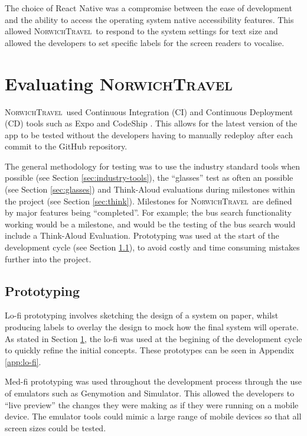\documentclass[cmpstyle]{ueacmpstyle}
\newcommand{\nt}{\textsc{NorwichTravel}}
\begin{document}
		The choice of React Native was a compromise between the ease of development and the ability to access the operating system native accessibility features. This allowed \nt \ to respond to the system settings for text size and allowed the developers to set specific labels for the screen readers to vocalise. 
		
	\section{Evaluating \nt} \label{sec:eval}
	\nt \ used Continuous Integration (CI) and Continuous Deployment (CD) tools such as Expo and CodeShip \citep{codeship}. This allows for the latest version of the app to be tested without the developers having to manually redeploy after each commit to the GitHub repository. 
	
	The general methodology for testing was to use the industry standard tools when possible (see Section \ref{sec:industry-tools}), the ``glasses'' test as often an possible (see Section \ref{sec:glasses}) and Think-Aloud evaluations during milestones within the project (see Section \ref{sec:think}). Milestones for \nt \ are defined by major features being ``completed''. For example; the bus search functionality working would be a milestone, and would be the testing of the bus search would include a Think-Aloud Evaluation. Prototyping was used at the start of the development cycle (see Section \ref{sec:proto}), to avoid costly and time consuming mistakes further into the project.
	
		\subsection{Prototyping} \label{sec:proto}
		Lo-fi prototyping involves sketching the design of a system on paper, whilst producing labels to overlay the design to mock how the final system will operate. As stated in Section \ref{sec:eval}, the lo-fi was used at the begining of the development cycle to quickly refine the initial concepts. These prototypes can be seen in Appendix \ref{app:lo-fi}.
		
		Med-fi prototyping was used throughout the development process through the use of emulators such as Genymotion and Simulator. This allowed the developers to ``live preview'' the changes they were making as if they were running on a mobile device. The emulator tools could mimic a large range of mobile devices so that all screen sizes could be tested.
		
\end{document}
